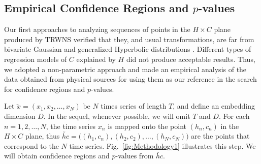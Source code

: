 \subsection{Empirical Confidence Regions and $p$-values}\label{confidenceRegions}


Our first approaches to analyzing sequences of points in the $H\times C$ plane produced by TRWNS verified that they, and usual transformations, are far from bivariate Gaussian and generalized Hyperbolic distributions .
Different types of regression models of $C$ explained by $H$ did not produce acceptable results.
Thus, we adopted a non-parametric approach and made an empirical analysis of the data obtained from physical sources for using them as our reference in the search for confidence regions and $p$-values.


Let $\utilde{x} =(x_1, x_2, \dots, x_N)$ be $N$ times series of length $T$, and define an embedding dimension $D$.
In the sequel, whenever possible, we will omit $T$ and $D$.
For each $n=1,2,\dots, N$, the time series $x_n$ is mapped onto the point $(h_n,c_n)$ in the $H\times C$ plane, thus $\utilde{hc}=\big((h_1,c_n), (h_2,c_2), \dots, (h_N,c_N)\big)$ are the points that correspond to the $N$ time series.
Fig.~\ref{fig:Methodology1} illustrates this step.
We will obtain confidence regions and $p$-values from $\utilde{hc}$.


